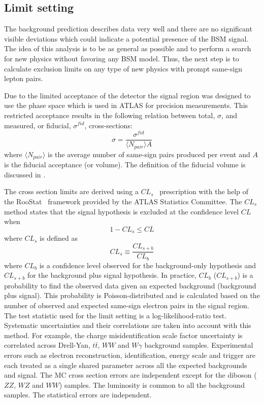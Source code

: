 \subsection{Limit setting}

The background prediction describes data very well and there are no significant visible deviations which could indicate a potential presence of the BSM signal.
The idea of this analysis is to be as general as possible and to perform a search for new physics without favoring any BSM model.
Thus, the next step is to calculate exclusion limits on any type of new physics with prompt same-sign lepton pairs.

Due to the limited acceptance of the detector the signal region was designed to use the phase space which is used in ATLAS for precision measurements.
This restricted acceptance results in the following relation between total, $\sigma$, and measured, or fiducial, $\sigma^{fid}$, cross-sections:
\begin{equation}
 \sigma = \dfrac{\sigma^{fid}}{\langle N_{pair} \rangle A}
 \label{eq:cross_section}
\end{equation}
where $\langle N_{pair} \rangle$ is the average number of same-sign pairs produced per event and $A$ is the fiducial acceptance (or volume).
The definition of the fiducial volume is discussed in .

The cross section limits are derived using a $CL_s$~\cite{CLs_tecnique,CLs_2} prescription with the help of the RooStat~\cite{RooStat_project} framework 
provided by the ATLAS Statistics Committee. The $CL_s$ method states that the signal hypothesis is excluded at the confidence level $CL$ when
\begin{equation}
 1 - CL_s \leq CL
\end{equation}
where $CL_s$ is defined as
\begin{equation}
 CL_s \equiv \dfrac{CL_{s+b}}{CL_b}
\end{equation}
where $CL_b$ is a confidence level observed for the background-only hypothesis and $CL_{s+b}$ for the background plus signal hypothesis.
In practice, $CL_b$ ($CL_{s+b}$) is a probability to find the observed data given an expected background (background plus signal).
This probability is Poisson-distributed and is calculated based on the number of observed and expected same-sign electron pairs in the signal region.
The test statistic used for the limit setting is a log-likelihood-ratio test.
Systematic uncertainties and their correlations are taken into account with this method.
For example, the charge misidentification scale factor uncertainty is correlated across Drell-Yan, $t\bar{t}$, $WW$ and $W\gamma$ background samples.
Experimental errors such as electron reconstruction, identification, energy scale and trigger are each treated as a single shared parameter across all the expected backgrounds and signal.
The MC cross section errors are independent except for the diboson ($ZZ$, $WZ$ and $WW$) samples.
The luminosity is common to all the background samples. The statistical errors are independent.

